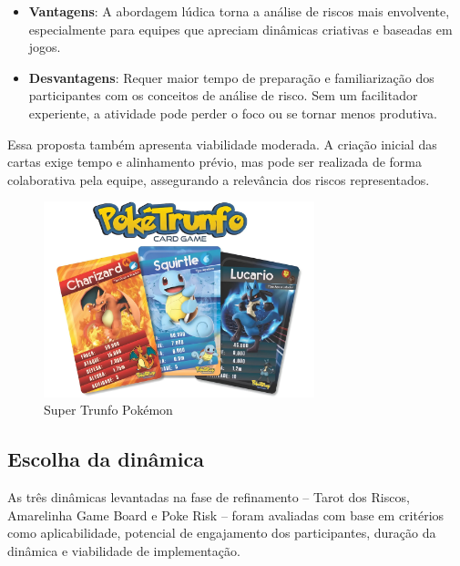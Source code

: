 \documentclass[
	12pt,
	openright,
	twoside,
	a4paper,
	english,
	brazil
	]{abntex2}
\begin{document}
\begin{itemize}
  \item \textbf{Vantagens}: A abordagem lúdica torna a análise de riscos mais envolvente, especialmente para equipes que apreciam dinâmicas criativas e baseadas em jogos. 
  \item \textbf{Desvantagens}: Requer maior tempo de preparação e familiarização dos participantes com os conceitos de análise de risco. Sem um facilitador experiente, a atividade pode perder o foco ou se tornar menos produtiva. 
\end{itemize}

Essa proposta também apresenta viabilidade moderada. A criação inicial das cartas exige tempo e alinhamento prévio, mas pode ser realizada de forma colaborativa pela equipe, assegurando a relevância dos riscos representados.

\begin{figure}[H]
  \centering
  \caption{\label{super-trunfo}Super Trunfo Pokémon}
  \includegraphics[width=0.7\textwidth]{super-trunfo}
\end{figure}

\subsection{Escolha da dinâmica}
\label{sec:escolha-dinamica}

As três dinâmicas levantadas na fase de refinamento -- Tarot dos Riscos, Amarelinha Game Board e Poke Risk -- foram avaliadas com base em critérios como aplicabilidade, potencial de engajamento dos participantes, duração da dinâmica e viabilidade de implementação.
\end{document}
